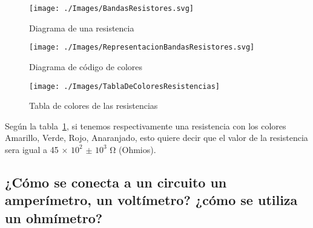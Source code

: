 \documentclass[letterpaper, 12pt]{report}
\begin{document}
\vspace{.5cm}

\begin{figure}[H]
	\begin{center}
		\texttt{[image: ./Images/BandasResistores.svg]}
		\caption{Diagrama de una resistencia}
	\end{center}
\end{figure}

\begin{figure}[H]
	\begin{center}
		\texttt{[image: ./Images/RepresentacionBandasResistores.svg]}
		\caption{Diagrama de código de colores}
	\end{center}
\end{figure}

\begin{figure}[H]
	\centering

	\texttt{[image: ./Images/TablaDeColoresResistencias]}

	\caption{Tabla de colores de las resistencias}
	\label{Tabla de colores de las resistencias}
\end{figure}

Según la tabla~\ref{Tabla de colores de las resistencias}, si tenemos
respectivamente una resistencia con los colores Amarillo, Verde, Rojo,
Anaranjado, esto quiere decir que el valor de la resistencia sera igual a
45 $\times{}$ $10^2$ $\pm$ $10^3$ Ω (Ohmios).

\subsection{¿Cómo se conecta a un circuito un amperímetro,
	un voltímetro? ¿cómo se utiliza un ohmímetro?}
\end{document}
